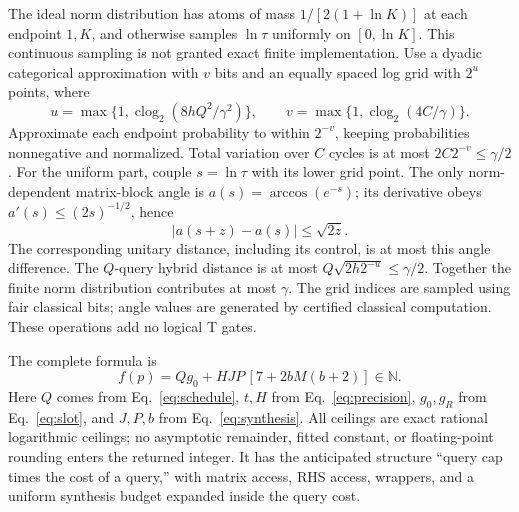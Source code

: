 \documentclass[11pt]{article}
\newcommand{\clog}{\operatorname{clog}_2}
\begin{document}
The ideal norm distribution has atoms of mass $1/[2(1+\ln K)]$ at each endpoint $1,K$, and otherwise samples $\ln\tau$ uniformly on $[0,\ln K]$. This continuous sampling is not granted exact finite implementation. Use a dyadic categorical approximation with $v$ bits and an equally spaced log grid with $2^u$ points, where
\begin{equation}\label{eq:sampling}
 u=\max\{1,\clog(8hQ^2/\gamma^2)\},\qquad
 v=\max\{1,\clog(4C/\gamma)\}.
\end{equation}
Approximate each endpoint probability to within $2^{-v}$, keeping probabilities nonnegative and normalized. Total variation over $C$ cycles is at most $2C2^{-v}\le\gamma/2$. For the uniform part, couple $s=\ln\tau$ with its lower grid point. The only norm-dependent matrix-block angle is $a(s)=\arccos(e^{-s})$; its derivative obeys $a'(s)\le(2s)^{-1/2}$, hence
\begin{equation}
 |a(s+z)-a(s)|\le\sqrt{2z}.
\end{equation}
The corresponding unitary distance, including its control, is at most this angle difference. The $Q$-query hybrid distance is at most $Q\sqrt{2h2^{-u}}\le\gamma/2$. Together the finite norm distribution contributes at most $\gamma$. The grid indices are sampled using fair classical bits; angle values are generated by certified classical computation. These operations add no logical T gates.

The complete formula is
\begin{equation}\label{eq:final}
 \boxed{f(p)=Q g_0+HJP\,[7+2bM(b+2)]\in\mathbb N.}
\end{equation}
Here $Q$ comes from Eq.~\eqref{eq:schedule}, $t,H$ from Eq.~\eqref{eq:precision}, $g_0,g_R$ from Eq.~\eqref{eq:slot}, and $J,P,b$ from Eq.~\eqref{eq:synthesis}. All ceilings are exact rational logarithmic ceilings; no asymptotic remainder, fitted constant, or floating-point rounding enters the returned integer. It has the anticipated structure ``query cap times the cost of a query,'' with matrix access, RHS access, wrappers, and a uniform synthesis budget expanded inside the query cost.
\end{document}
